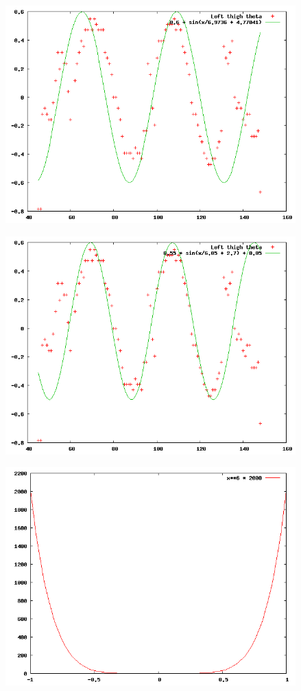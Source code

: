 \documentclass[12pt,a4paper]{article}
\begin{document}
\begin{center}\includegraphics[width=11.2cm]{autofit.png}\end{center}
\begin{center}\includegraphics[width=11.2cm]{manualfit.png}\end{center}
\begin{center}\includegraphics[width=11.2cm]{corrections.png}\end{center}
\end{document}
